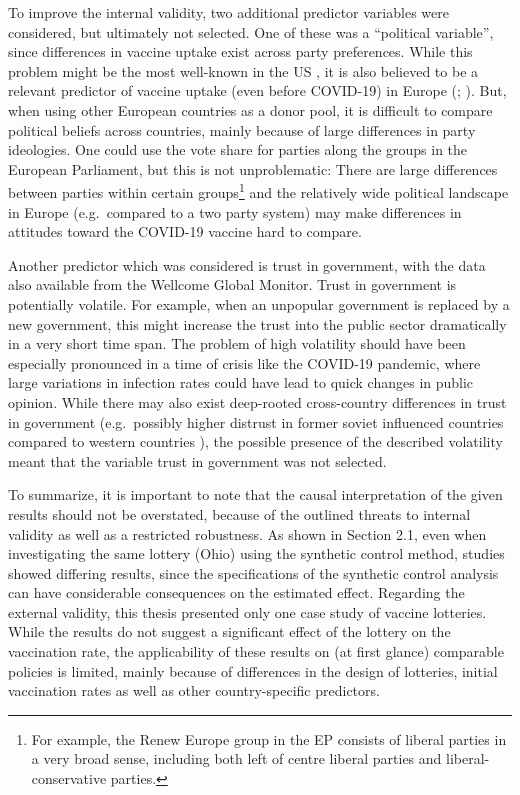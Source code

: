 \documentclass{scrbook}
\begin{document}
To improve the internal validity, two additional predictor variables
were considered, but ultimately not selected. One of these was a
``political variable'', since differences in vaccine uptake exist across
party preferences. While this problem might be the most well-known in
the US \parencite{ruiz_predictors_2021}, it is also believed to be a
relevant predictor of vaccine uptake (even before COVID-19) in Europe
(\cite{schernhammer_correlates_2022}; \cite{kennedy_populist_2019}).
But, when using other European countries as a donor pool, it is
difficult to compare political beliefs across countries, mainly because
of large differences in party ideologies. One could use the vote share
for parties along the groups in the European Parliament, but this is not
unproblematic: There are large differences between parties within
certain
groups\footnote{For example, the Renew Europe group in the EP consists of liberal parties in a very broad sense, including both left of centre liberal parties and liberal-conservative parties.}
and the relatively wide political landscape in Europe (e.g.~compared to
a two party system) may make differences in attitudes toward the
COVID-19 vaccine hard to compare.

Another predictor which was considered is trust in government, with the
data also available from the Wellcome Global Monitor. Trust in
government is potentially volatile. For example, when an unpopular
government is replaced by a new government, this might increase the
trust into the public sector dramatically in a very short time span. The
problem of high volatility should have been especially pronounced in a
time of crisis like the COVID-19 pandemic, where large variations in
infection rates could have lead to quick changes in public opinion.
While there may also exist deep-rooted cross-country differences in
trust in government (e.g.~possibly higher distrust in former soviet
influenced countries compared to western countries
\parencite{costa-font_institutional_2023}), the possible presence of the
described volatility meant that the variable trust in government was not
selected.

To summarize, it is important to note that the causal interpretation of
the given results should not be overstated, because of the outlined
threats to internal validity as well as a restricted robustness. As
shown in Section 2.1, even when investigating the same lottery (Ohio)
using the synthetic control method, studies showed differing results,
since the specifications of the synthetic control analysis can have
considerable consequences on the estimated effect. Regarding the
external validity, this thesis presented only one case study of vaccine
lotteries. While the results do not suggest a significant effect of the
lottery on the vaccination rate, the applicability of these results on
(at first glance) comparable policies is limited, mainly because of
differences in the design of lotteries, initial vaccination rates as
well as other country-specific predictors.
\end{document}
